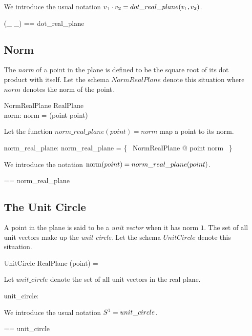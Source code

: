 \documentclass{amsart}
\begin{document}
We introduce the usual notation $v_1 \mathbin{\cdot} v_2 = dot\_real\_plane(v_1, v_2)$.

\begin{zed}
	(\_ \dotRtwo \_) == dot\_real\_plane
\end{zed}

\subsection{Norm}

The \textit{norm} of a point in the plane is defined to be the square root of its dot product with itself.
Let the schema $NormRealPlane$ denote this situation where $norm$ denotes the norm of the point.

\begin{schema}{NormRealPlane}
	RealPlane \\
	norm: \Rgez
\where
	norm = \sqrtR(point \dotRtwo point)
\end{schema}

Let the function $norm\_real\_plane(point) = norm$ map a point to its norm.

\begin{axdef}
	norm\_real\_plane: \Rtwo \fun \Rgez
\where
	norm\_real\_plane = \{~ NormRealPlane @ point \mapsto norm ~\}
\end{axdef}

We introduce the notation $\operatorname{norm}(point) = norm\_real\_plane(point)$.

\begin{zed}
	\normRtwo == norm\_real\_plane
\end{zed}

\subsection{The Unit Circle}

A point in the plane is said to be a \textit{unit vector} when it has norm $1$.
The set of all unit vectors make up the \textit{unit circle}.
Let the schema $UnitCircle$ denote this situation.

\begin{schema}{UnitCircle}
	RealPlane
\where
	\normRtwo(point) = \oneR
\end{schema}

Let $unit\_circle$ denote the set of all unit vectors in the real plane.

\begin{axdef}
	unit\_circle: \power \Rtwo
\end{axdef}

We introduce the usual notation $S^1 = unit\_circle$.

\begin{zed}
	\sphereOne == unit\_circle
\end{zed}

\printbibliography
\end{document}
